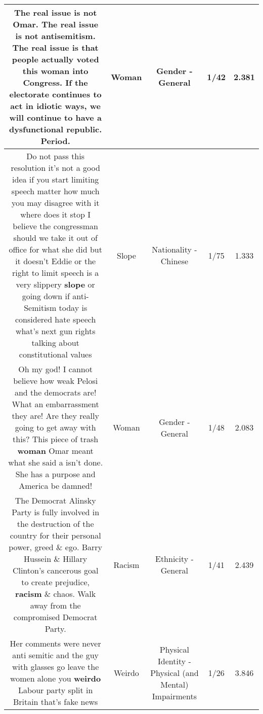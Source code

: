 \documentclass[11pt]{article}
\newlength\mylength
\begin{document}
\begin{center}
\begin{longtable}{|C{.65\mylength}|C{.30\mylength}|C{.12\mylength}|C{.12\mylength}|C{.12\mylength}|}
  \small The real issue is not Omar. The real issue is not antisemitism. The real issue is that people actually voted this \textbf{woman} into Congress. If the electorate continues to act in idiotic ways, we will continue to have a dysfunctional republic. Period.\normalsize   & Woman & Gender - General & 1/42 & 2.381 \\  \hline
  \small Do not pass this resolution it's not a good idea if you start limiting speech matter how much you may disagree with it where does it stop I believe the congressman should we take it out of office for what she did but it doesn't Eddie or the right to limit speech is a very slippery \textbf{slope} or going down if anti-Semitism today is considered hate speech what's next gun rights talking about constitutional values\normalsize   & Slope & Nationality - Chinese & 1/75 & 1.333 \\  \hline
  \small Oh my god! I cannot believe how weak Pelosi and the democrats are! What an embarrassment they are! Are they really going to get away with this? This piece of trash \textbf{woman} Omar meant what she said a isn't done. She has a purpose and America be damned!\normalsize   & Woman & Gender - General & 1/48 & 2.083 \\  \hline
  \small The Democrat Alinsky Party is fully involved in the destruction of the country for their personal power, greed \& ego. Barry Hussein \& Hillary Clinton's cancerous goal to create prejudice, \textbf{racism} \& chaos.  Walk away from the compromised Democrat Party.\normalsize   & Racism & Ethnicity - General & 1/41 & 2.439 \\  \hline
  \small Her comments were never anti semitic and the guy with glasses go leave the women alone you \textbf{weirdo} Labour party split in Britain that's fake news\normalsize   & Weirdo & Physical Identity - Physical (and Mental) Impairments & 1/26 & 3.846 \\  \hline

\end{longtable}
\end{center}
\end{document}
